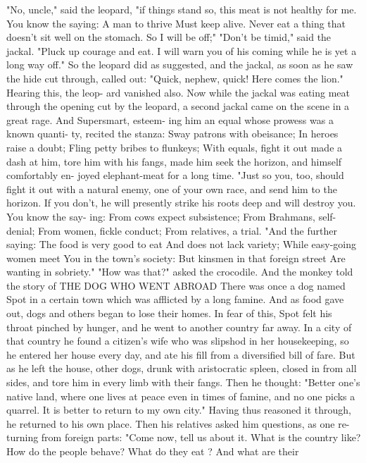 \documentclass{book}
\begin{document}
"No, uncle," said the leopard, "if things stand so,
this meat is not healthy for me. You know the saying:
A man to thrive
Must keep alive.
Never eat a thing that doesn't sit well on the stomach.
So I will be off;" "Don't be timid," said the jackal.
"Pluck up courage and eat. I will warn you of his
coming while he is yet a long way off." So the leopard
did as suggested, and the jackal, as soon as he saw
the hide cut through, called out: "Quick, nephew,
quick! Here comes the lion." Hearing this, the leop-
ard vanished also.
Now while the jackal was eating meat through
the opening cut by the leopard, a second jackal came
on the scene in a great rage. And Supersmart, esteem-
ing him an equal whose prowess was a known quanti-
ty, recited the stanza:
Sway patrons with obeisance;
In heroes raise a doubt;
Fling petty bribes to flunkeys;
With equals, fight it out
made a dash at him, tore him with his fangs, made
him seek the horizon, and himself comfortably en-
joyed elephant-meat for a long time.
"Just so you, too, should fight it out with a natural
enemy, one of your own race, and send him to the
horizon. If you don't, he will presently strike his
roots deep and will destroy you. You know the say-
ing:
From cows expect subsistence;
From Brahmans, self-denial;
From women, fickle conduct;
From relatives, a trial.
"And the further saying:
The food is very good to eat
And does not lack variety;
While easy-going women meet
You in the town's society:
But kinsmen in that foreign street
Are wanting in sobriety."
"How was that?" asked the crocodile.   And the
monkey told the story of
THE DOG WHO WENT ABROAD
There was once a dog named Spot in a certain
town which was afflicted by a long famine. And as
food gave out, dogs and others began to lose their
homes. In fear of this, Spot felt his throat pinched
by hunger, and he went to another country far away.
In a city of that country he found a citizen's wife
who was slipshod in her housekeeping, so he entered
her house every day, and ate his fill from a diversified
bill of fare. But as he left the house, other dogs,
drunk with aristocratic spleen, closed in from all
sides, and tore him in every limb with their fangs.
Then he thought: "Better one's native land,
where one lives at peace even in times of famine, and
no one picks a quarrel. It is better to return to my
own city." Having thus reasoned it through, he
returned to his own place.
Then his relatives asked him questions, as one re-
turning from foreign parts: "Come now, tell us about
it. What is the country like? How do the people
behave? What do they eat ? And what are their
\end{document}
